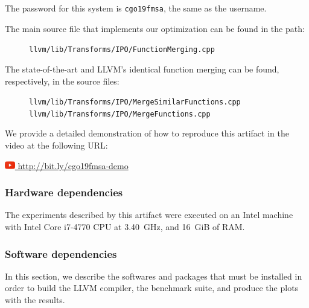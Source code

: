 {\begin{itemize}
The password for this system is \texttt{cgo19fmsa}, the same as the username.

\end{itemize}

The main source file that implements our optimization can be found in the path:
\begin{figure}[h]
\texttt{\footnotesize llvm/lib/Transforms/IPO/FunctionMerging.cpp}
\end{figure}

The state-of-the-art and LLVM's identical function merging can be found,
respectively, in the source files:
\begin{figure}[h]
\texttt{\footnotesize llvm/lib/Transforms/IPO/MergeSimilarFunctions.cpp}
\texttt{\footnotesize llvm/lib/Transforms/IPO/MergeFunctions.cpp}
\end{figure}

We provide a detailed demonstration of how to reproduce this artifact in the video at the following URL:

\href{http://bit.ly/cgo19fmsa-video}{\includegraphics[width=1.2em]{figs/artifact/youtube.png} http://bit.ly/cgo19fmsa-demo}


\subsubsection{Hardware dependencies}


The experiments described by this artifact were executed on an Intel machine
with Intel Core i7-4770 CPU at 3.40~GHz, and 16~GiB of RAM.


\subsubsection{Software dependencies}

In this section, we describe the softwares and packages that must be installed 
in order to build the LLVM compiler, the benchmark suite, and produce the plots with the results.

}

